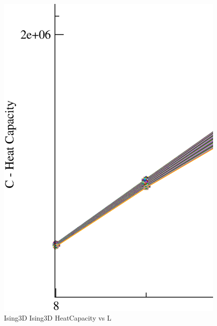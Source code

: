 \begin{figure}[!htpb]
  \centering
  \includegraphics[width=\textwidth]{./plots/Ising3D/Ising3D_HeatCapacity_vs_L.eps}
  \caption{Ising3D Ising3D HeatCapacity vs L}
\end{figure}

